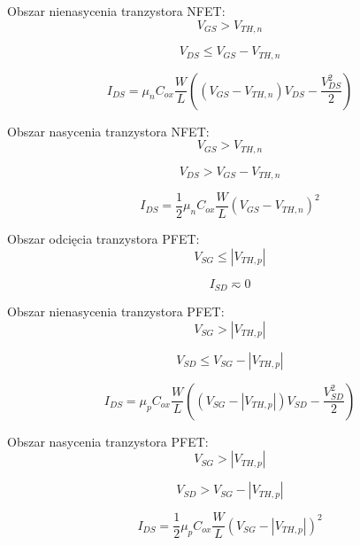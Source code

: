 \documentclass[10pt,a4paper]{report}
\theoremstyle{definition}
\theoremstyle{definition}
\theoremstyle{definition}
\theoremstyle{definition}
\theoremstyle{definition}
\begin{document}
	{	Obszar nienasycenia tranzystora NFET:
		\begin{equation}
			V_{GS} > V_{TH,n}
		\end{equation}
		
		\begin{equation}
			V_{DS} \leq V_{GS} - V_{TH,n}
		\end{equation}
		
		\begin{equation}
			I_{DS} = \mu_n C_{ox} \frac{W}{L} \left( \left(V_{GS} - V_{TH,n}\right) V_{DS} - \frac{V_{DS}^2}{2}  \right)
		\end{equation}
	}

	{	Obszar nasycenia tranzystora NFET:
		\begin{equation}
			V_{GS} > V_{TH,n}
		\end{equation}
		
		\begin{equation}
			V_{DS} > V_{GS} - V_{TH,n}
		\end{equation}
		
		\begin{equation}
			I_{DS} = \frac{1}{2} \mu_n C_{ox} \frac{W}{L} \left( V_{GS} - V_{TH,n} \right)^2
		\end{equation}	
	}

	{	Obszar odcięcia tranzystora PFET:
		\begin{equation}
		V_{SG} \leq \left|V_{TH,p}\right|
		\end{equation}
		
		\begin{equation}
		I_{SD} \eqsim 0
		\end{equation}
	}
	
	{	Obszar nienasycenia tranzystora PFET:
		\begin{equation}
		V_{SG} > \left|V_{TH,p}\right|
		\end{equation}
		
		\begin{equation}
		V_{SD} \leq V_{SG} - \left|V_{TH,p}\right|
		\end{equation}
		
		\begin{equation}
		I_{DS} = \mu_p C_{ox} \frac{W}{L} \left( \left(V_{SG} - \left|V_{TH,p}\right| \right) V_{SD} - \frac{V_{SD}^2}{2}  \right)
		\end{equation}
	}
	
	{	Obszar nasycenia tranzystora PFET:
		\begin{equation}
		V_{SG} > \left|V_{TH,p}\right|
		\end{equation}
		
		\begin{equation}
		V_{SD} > V_{SG} - \left|V_{TH,p}\right|
		\end{equation}
		
		\begin{equation}
		I_{DS} = \frac{1}{2} \mu_p C_{ox} \frac{W}{L} \left( V_{SG} - \left|V_{TH,p}\right| \right)^2
		\end{equation}	
	}
\end{document}
